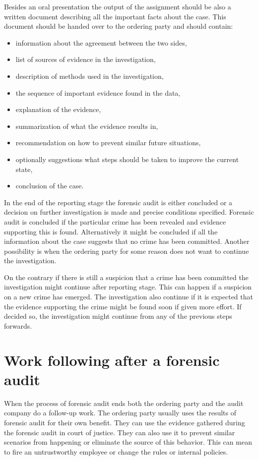 Besides an oral presentation the output of the assignment should be also a written document describing all the important facts about the case. This document should be handed over to the ordering party and should contain:
\begin{itemize}
\item information about the agreement between the two sides,
\item list of sources of evidence in the investigation,
\item description of methods used in the investigation,
\item the sequence of important evidence found in the data,
\item explanation of the evidence,
\item summarization of what the evidence results in,
\item recommendation on how to prevent similar future situations,
\item optionally suggestions what steps should be taken to improve the current state,
\item conclusion of the case.
\end {itemize}


In the end of the reporting stage the forensic audit is either concluded or a decision on further investigation is made and precise conditions specified. Forensic audit is concluded if the particular crime has been revealed and evidence supporting this is found. Alternatively it might be concluded if all the information about the case suggests that no crime has been committed. Another possibility is when the ordering party for some reason does not want to continue the investigation. 

On the contrary if there is still a suspicion that a crime has been committed the investigation might continue after reporting stage. This can happen if a suspicion on a new crime has emerged. The investigation also continue if it is expected that the evidence supporting the crime might be found soon if given more effort. If decided so, the investigation might continue from any of the previous steps forwards. 




\section{Work following after a forensic audit}

When the process of forensic audit ends both the ordering party and the audit company do a follow-up work. The ordering party usually uses the results of forensic audit for their own benefit. They can use the evidence gathered during the forensic audit in court of justice. They can also use it to prevent similar scenarios from happening or eliminate the source of this behavior. This can mean to fire an untrustworthy employee or change the rules or internal policies. 

